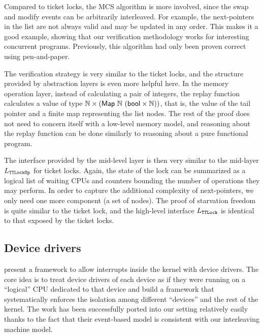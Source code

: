 {%
\ignore{
\begin{figure}
 = C, multicols=2] {source_code/mcs_lock.c}
\caption{Pseudocode of MCS-lock implementation.}
\label{fig:exp:mcs_lock}
\end{figure}
}


Compared to ticket locks, the MCS algorithm is more involved, since
the swap and modify events can be arbitrarily interleaved. For
example, the next-pointers in the list are not always valid and may
be updated in any order.  This makes it a good example, showing that
our verification methodology works for interesting concurrent
programs. Previously, this algorithm had only been proven correct
using pen-and-paper.

The verification strategy is very similar to the ticket locks,
and the structure provided by abstraction layers is even more helpful here. In the
memory operation layer, instead of calculating a pair of integers, the
replay function calculates a value of type 
$\integer \times (\mathsf{Map}\ \integer\ (\mathsf{bool}\times \integer))$, that is,
the value of the tail pointer and a finite map representing the list
nodes.  The rest of the proof does not need to concern itself
with a low-level memory model, and reasoning about the
replay function can be done similarly to reasoning about a pure
functional program.

The interface provided by the mid-level layer is then very similar to
the mid-layer $L_{\texttt{TTLockOp}}$ for ticket locks. Again, the state of the lock
can be summarized as a logical list of waiting CPUs and counters
bounding the number of operations they may perform. In order to capture the
additional complexity of next-pointers, we only need one more
component (a set of nodes). The proof of starvation freedom is quite
similar to the ticket lock, and the high-level interface $L_{\texttt{TTLock}}$ is
identical to that exposed by the ticket locks.


\ignore{
\begin{figure}
 = C, multicols=2] {source_code/mcs_lock.c}
\caption{MCS Lock Implementation}
\label{fig:exp:mcs_lock}
\end{figure}
}

\subsection{Device drivers}
\label{sec:con:device}
\citet{chen16} present a framework to allow interrupts
inside the kernel
with device drivers. The core idea is to treat device drivers of
each device as if they were running on a ``logical'' CPU dedicated to that device
and build a framework that systematically enforces the isolation among different
``devices'' and the rest of the kernel. The work has been successfully ported
into our setting relatively easily thanks to the fact that their event-based
 model is consistent with our interleaving machine model.


}
